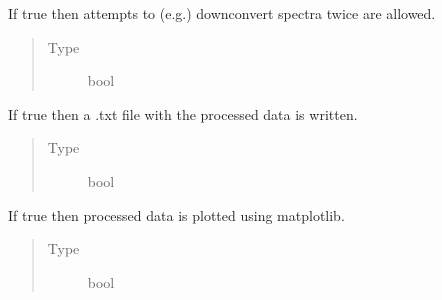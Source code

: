 \documentclass[a4paper,10pt,english]{sphinxmanual}
\begin{document}
\begin{fulllineitems}
\begin{fulllineitems}
\begin{quote}
\begin{description}
\end{description}\end{quote}

\end{fulllineitems}


\begin{fulllineitems}
\label{\detokenize{sfgtools:sfgtools.SFGProcessTools.global_force}}
\sphinxAtStartPar
If true then attempts to (e.g.) downconvert spectra twice are allowed.
\begin{quote}\begin{description}
\item[{Type}] \leavevmode
\sphinxAtStartPar
bool

\end{description}\end{quote}

\end{fulllineitems}


\begin{fulllineitems}
\label{\detokenize{sfgtools:sfgtools.SFGProcessTools.write_file_check}}
\sphinxAtStartPar
If true then a .txt file with the processed data is written.
\begin{quote}\begin{description}
\item[{Type}] \leavevmode
\sphinxAtStartPar
bool

\end{description}\end{quote}

\end{fulllineitems}


\begin{fulllineitems}
\label{\detokenize{sfgtools:sfgtools.SFGProcessTools.plot_data_check}}
\sphinxAtStartPar
If true then processed data is plotted using matplotlib.
\begin{quote}\begin{description}
\item[{Type}] \leavevmode
\sphinxAtStartPar
bool


\end{description}
\end{quote}
\end{fulllineitems}
\end{fulllineitems}
\end{document}
